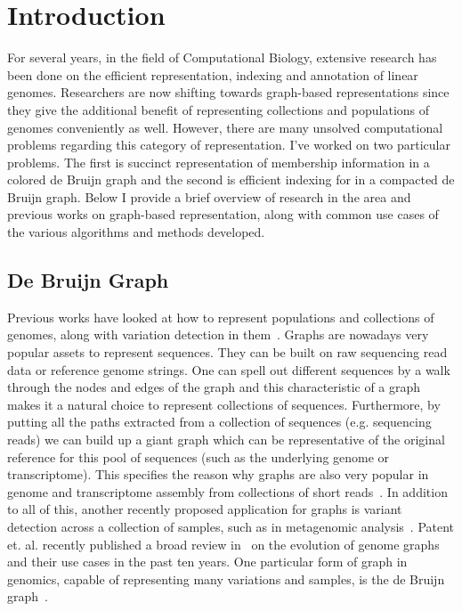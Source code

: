 \chapter{Introduction}

For several years, in the field of Computational Biology, extensive research has been done on the efficient representation, indexing and annotation of linear genomes. Researchers are now shifting towards graph-based representations since they give the additional benefit of representing collections and populations of genomes conveniently as well. However, there are many unsolved computational problems regarding this category of representation. I’ve worked on two particular problems. The first is succinct representation of membership information in a colored de Bruijn graph and the second is efficient indexing for \kmers in a compacted de Bruijn graph. Below I provide a brief overview of research in the area and previous works on graph-based representation, along with common use cases of the various algorithms and methods developed.


\section{De Bruijn Graph}
\label{subsec:dbg}
Previous works have looked at how to represent populations and collections of genomes, along with variation detection in them~\cite{paten2017genome}. Graphs are nowadays very popular assets to represent sequences. They can be built on raw sequencing read data or reference genome strings. One can spell out different sequences by a walk through the nodes and edges of the graph and this characteristic of a graph makes it a natural choice to represent collections of sequences. Furthermore, by putting all the paths extracted from a collection of sequences (e.g. sequencing reads) we can build up a giant graph which can be representative of the original reference for this pool of sequences (such as the underlying genome or transcriptome). This specifies the reason why graphs are also very popular in genome and transcriptome assembly from collections of short reads~\cite{pevzner2001eulerian,grabherr2011full,chang2015bridger,kannan2016shannon}. In addition to all of this, another recently proposed application for graphs is variant detection across a collection of samples, such as in metagenomic analysis~\cite{Iqbal2012Novo,MuggliBoNo17}. Patent et. al. recently published a broad review in~\cite{paten2017genome} on the evolution of genome graphs and their use cases in the past ten years. One particular form of graph in genomics, capable of representing many variations and samples, is the de Bruijn graph~\cite{pevzner2001eulerian,zerbino2007velvet,Bruijn46}. 

